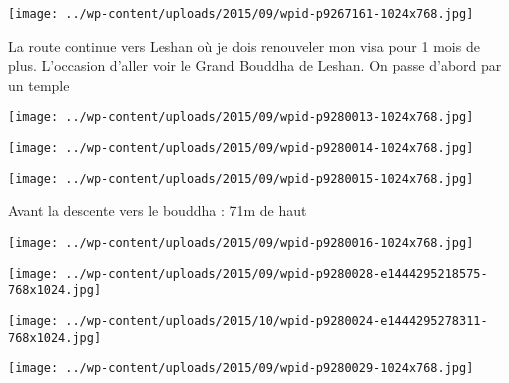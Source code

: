 \centerline{\texttt{[image: ../wp-content/uploads/2015/09/wpid-p9267161-1024x768.jpg]} } 
 \newline
 La route continue vers Leshan où je dois renouveler mon visa pour 1 mois de plus. L'occasion d'aller voir le Grand Bouddha de Leshan. \newline
 On passe d'abord par un temple \newline
 \newline
\centerline{\texttt{[image: ../wp-content/uploads/2015/09/wpid-p9280013-1024x768.jpg]} } 
 \newline
 \newline
\centerline{\texttt{[image: ../wp-content/uploads/2015/09/wpid-p9280014-1024x768.jpg]} } 
 \newline
 \newline
\centerline{\texttt{[image: ../wp-content/uploads/2015/09/wpid-p9280015-1024x768.jpg]} } 
 \newline
 Avant la descente vers le bouddha : 71m de haut \newline
 \newline
\centerline{\texttt{[image: ../wp-content/uploads/2015/09/wpid-p9280016-1024x768.jpg]} } 
 \newline
 \newline
\centerline{\texttt{[image: ../wp-content/uploads/2015/09/wpid-p9280028-e1444295218575-768x1024.jpg]} } 
 \newline
 \newline
\centerline{\texttt{[image: ../wp-content/uploads/2015/10/wpid-p9280024-e1444295278311-768x1024.jpg]} } 
 \newline
 \newline
\centerline{\texttt{[image: ../wp-content/uploads/2015/09/wpid-p9280029-1024x768.jpg]} } 
 \newline

\newpage
 
